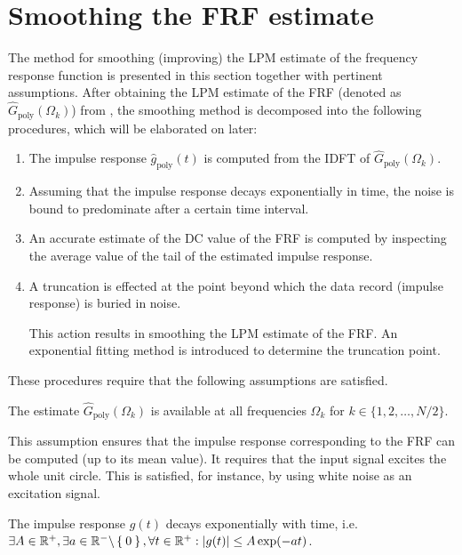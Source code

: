 \section{Smoothing the \gls{FRF} estimate}\label{se:smoothingFRFestimate}
The method for smoothing (improving) the \gls{LPM} estimate of the frequency response function  is presented in this section together with pertinent assumptions. After obtaining the \gls{LPM} estimate of the \gls{FRF} (denoted as $\hat{G}_{\mathrm{poly}}(\Omega_k)$) from , the smoothing method is decomposed into the following procedures, which will be elaborated on later:
\begin{enumerate}
\item The impulse response $\hat g_\mathrm{poly}(t)$  is computed from the \gls{IDFT} of $\hat{G}_{\mathrm{poly}}(\Omega_k)$.

\item
Assuming that the impulse response decays exponentially in time, the noise is bound to predominate after a certain time interval. 

\item
An accurate estimate of the \gls{DC} value of the \gls{FRF} is computed by inspecting the average value of the tail of the estimated impulse response.

\item
A truncation is effected at the point beyond which the data record (impulse response) is buried in noise. 

This action results in smoothing the \gls{LPM} estimate of the \gls{FRF}. 
An exponential fitting method is introduced to determine the truncation point.
\end{enumerate}

These procedures require that the following assumptions are satisfied.

\begin{assumption}
The estimate $\hat G_\mathrm{poly}(\Omega_k)$ is available at all frequencies $\Omega_k$ for $k\in\{1,2,\dots,N/2\}$.
\end{assumption}

This assumption ensures that the impulse response corresponding to the \gls{FRF} can be computed (up to its mean value). It requires that the input signal excites the whole unit circle. This is satisfied, for instance, by using white noise as an excitation signal.


\begin{assumption}\label{ass:imprespdecay}
The impulse response $g(t)$ decays exponentially with time, i.e. $\exists A \in \mathbb{R}^{+}, \exists a \in \mathbb{R}^{-} \backslash \Set{0}, \forall t \in \mathbb{R}^{+}: \left| g(t) \right| \leq A \exp(- a t)$.
\end{assumption}

